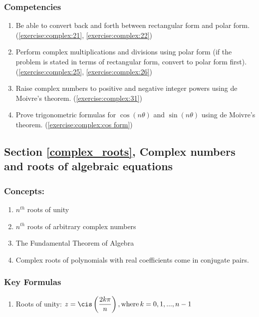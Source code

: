 \subsubsection*{Competencies}
\begin{enumerate}
\item
Be able to convert back and forth between rectangular form and polar form. (\ref{exercise:complex:21}, \ref{exercise:complex:22})
\item
Perform complex multiplications and divisions using polar form (if the problem is stated in terms of rectangular form, convert to polar form first). (\ref{exercise:complex:25}, \ref{exercise:complex:26})
\item
Raise complex numbers to positive and negative integer powers using de Moivre's theorem. (\ref{exercise:complex:31})
\item
Prove trigonometric formulas for $\cos(n\theta)$ and $\sin(n\theta)$ using de Moivre's theorem. (\ref{exercise:complex:cos form})
\end{enumerate}


\subsection*{Section \ref{complex_roots}, Complex numbers and roots of algebraic equations}
\subsubsection*{Concepts:}
\begin{enumerate}
\item 
$n^{th}$ roots of unity
\item
$n^{th}$ roots of arbitrary complex numbers
\item
The Fundamental Theorem of Algebra
\item
Complex roots of polynomials with real coefficients come in conjugate pairs.
\end{enumerate}

\subsubsection*{Key Formulas}
\begin{enumerate}
\item 
Roots of unity: $z = \cis\left(\dfrac{2k\pi}{n}\right),\text{where} \, k = 0, 1, ... , n - 1 $
\end{enumerate}

